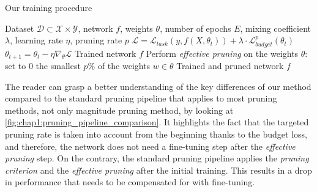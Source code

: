 \begin{algorithm}
  \caption{Our training procedure}
  \label{alg:chap1:training_pruning}
  \begin{algorithmic}
    \REQUIRE Dataset $\mathcal{D} \subset \mathcal{X} \times \mathcal{Y}$, network $f$,
    weights $\theta$, number of epochs $E$, mixing coefficient $\lambda$, learning
    rate $\eta$, pruning rate $p$
    \STATE $\mathcal{L}= \mathcal{L}_{task}(y, f(X, \theta_t)) + \lambda \cdot
      \mathcal{L}^{p}_{budget}(\theta_t )$ 
    \STATE $\theta_{t+1} = \theta_t - \eta \nabla_{\theta} \mathcal{L}$ 
    \ENDFOR
    \ENDFOR
    \RETURN Trained network $f$
    \STATE Perform \emph{effective pruning} on the weights $\theta$: set to 0 the
    smallest $p$\% of the weights $w\in\theta$
    \RETURN Trained and pruned network $f$
  \end{algorithmic}
\end{algorithm}


The reader can grasp a better understanding of the key differences of our method
compared to the standard pruning pipeline that applies to most pruning methods,
not only magnitude pruning method, by looking at
\cref{fig:chap1:pruning_pipeline_comparison}. It highlights the fact that the
targeted pruning rate is taken into account from the beginning thanks to the
budget loss, and therefore, the network does not need a fine-tuning step after
the \emph{effective pruning} step. On the contrary, the standard pruning
pipeline applies the \emph{pruning criterion} and the \emph{effective pruning}
after the initial training. This results in a drop in performance that needs to
be compensated for with fine-tuning. \\

